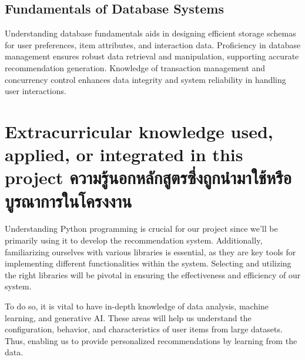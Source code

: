 \subsection{Fundamentals of Database Systems}

Understanding database fundamentals aids in designing efficient storage schemas for user 
preferences, item attributes, and interaction data. Proficiency in database management 
ensures robust data retrieval and manipulation, supporting accurate recommendation generation. 
Knowledge of transaction management and concurrency control enhances data integrity and 
system reliability in handling user interactions.

\section{\ifenglish%
Extracurricular knowledge used, applied, or integrated in this project
\else%
ความรู้นอกหลักสูตรซึ่งถูกนำมาใช้หรือบูรณาการในโครงงาน
\fi
}

Understanding Python programming is crucial for our project since we'll be primarily using it 
to develop the recommendation system. Additionally, familiarizing ourselves with various 
libraries is essential, as they are key tools for implementing different functionalities 
within the system. Selecting and utilizing the right libraries will be pivotal in ensuring 
the effectiveness and efficiency of our system.

To do so, it is vital to have in-depth knowledge of data analysis, machine learning, 
and generative AI. These areas will help us understand the configuration, behavior, and 
characteristics of user items from large datasets. Thus, enabling us to provide personalized 
recommendations by learning from the data.